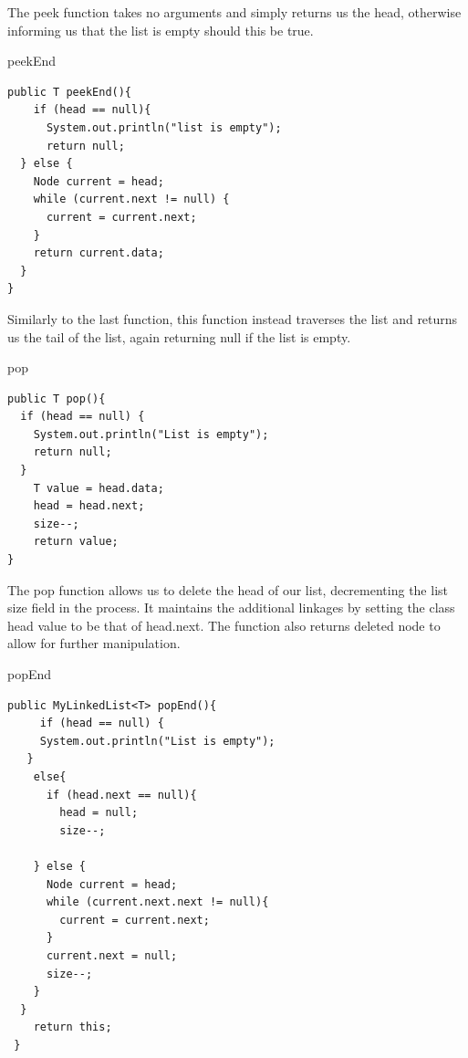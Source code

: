 \documentclass[a4paper]{article}
\begin{document}
The peek function takes no arguments and simply returns us the head, 
otherwise informing us that the list is empty should this be true.

\pagebreak


\begin{algorithm}
\caption{peekEnd}\label{euclid}

\begin{verbatim}
public T peekEnd(){
    if (head == null){
      System.out.println("list is empty");
      return null;
  } else {
    Node current = head;
    while (current.next != null) {
      current = current.next;
    }
    return current.data;
  }
}
\end{verbatim}

\end{algorithm}


Similarly to the last function, this function instead traverses the 
list and returns us the tail of the list, again returning null if 
the list is empty.



\begin{algorithm}
\caption{pop}\label{euclid}

\begin{verbatim}
public T pop(){
  if (head == null) {
    System.out.println("List is empty");
    return null;
  }
    T value = head.data;
    head = head.next;
    size--;
    return value;
}
\end{verbatim}

\end{algorithm}


The pop function allows us to delete the head of our list, 
decrementing the list size field in the process. 
It maintains the additional linkages by setting the class
head value to be that of head.next. The function also returns 
deleted node to allow for further manipulation.

\pagebreak

\begin{algorithm}
\caption{popEnd}\label{euclid}

\begin{verbatim}
public MyLinkedList<T> popEnd(){
     if (head == null) {
     System.out.println("List is empty");  
   }
    else{
      if (head.next == null){
        head = null;
        size--;
        
    } else {
      Node current = head;
      while (current.next.next != null){
        current = current.next;
      }
      current.next = null;
      size--;
    }
  }
    return this;
 }
\end{verbatim}

\end{algorithm}
\end{document}
